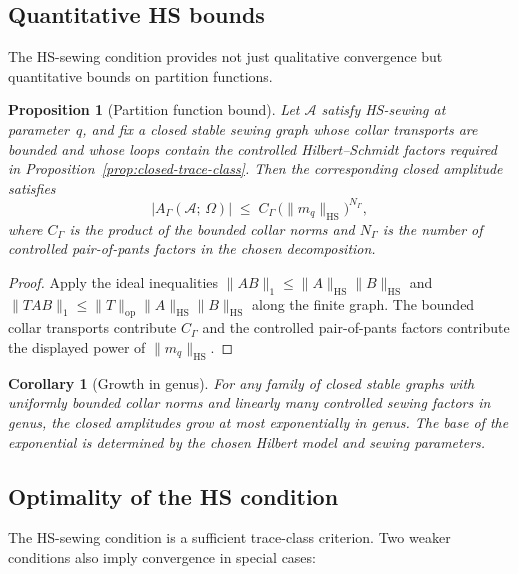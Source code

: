 \documentclass[11pt,reqno]{amsart}
\newtheorem{proposition}[theorem]{Proposition}
\newtheorem{corollary}[theorem]{Corollary}
\theoremstyle{definition}
\theoremstyle{remark}
\newcommand{\cA}{\mathcal{A}}
\newcommand{\HS}{\mathrm{HS}}
\numberwithin{equation}{section}
\begin{document}
\subsection{Quantitative HS bounds}\label{subsec:quantitative-hs}

The HS-sewing condition provides not just qualitative
convergence but quantitative bounds on partition functions.

\begin{proposition}[Partition function bound]
\label{prop:partition-bound}
Let $\cA$ satisfy HS-sewing at parameter~$q$, and fix a closed
stable sewing graph whose collar transports are bounded and whose
loops contain the controlled Hilbert--Schmidt factors required in
Proposition~\ref{prop:closed-trace-class}. Then the corresponding
closed amplitude satisfies
\begin{equation}\label{eq:partition-bound}
|A_\Gamma(\cA;\,\Omega)|
\;\leq\;
C_\Gamma\,\bigl(\|m_q\|_{\HS}\bigr)^{N_\Gamma},
\end{equation}
where $C_\Gamma$ is the product of the bounded collar norms and
$N_\Gamma$ is the number of controlled pair-of-pants factors in the
chosen decomposition.
\end{proposition}

\begin{proof}
Apply the ideal inequalities
$\|AB\|_1\leq\|A\|_{\HS}\|B\|_{\HS}$ and
$\|TAB\|_1\leq\|T\|_{\mathrm{op}}\|A\|_{\HS}\|B\|_{\HS}$
along the finite graph. The bounded collar transports contribute
$C_\Gamma$ and the controlled pair-of-pants factors contribute
the displayed power of $\|m_q\|_{\HS}$.
\end{proof}

\begin{corollary}[Growth in genus]\label{cor:growth-genus}
For any family of closed stable graphs with uniformly bounded collar
norms and linearly many controlled sewing factors in genus, the
closed amplitudes grow at most exponentially in genus. The base of
the exponential is determined by the chosen Hilbert model and sewing
parameters.
\end{corollary}

\subsection{Optimality of the HS condition}
\label{subsec:hs-optimality}

The HS-sewing condition is a sufficient trace-class criterion.
Two weaker conditions also imply convergence in special cases:
\end{document}
